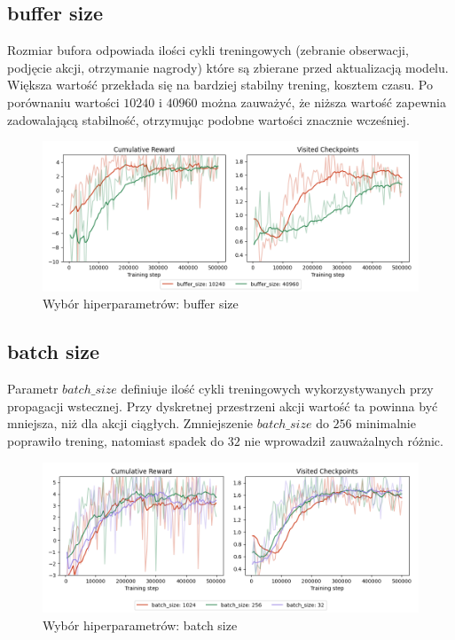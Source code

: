 \subsection{buffer size}
Rozmiar bufora odpowiada ilości cykli treningowych (zebranie obserwacji, podjęcie akcji, otrzymanie nagrody) które są zbierane przed aktualizacją modelu. Większa wartość przekłada się na bardziej stabilny trening, kosztem czasu. Po porównaniu wartości $10240$ i $40960$ można zauważyć, że niższa wartość zapewnia zadowalającą stabilność, otrzymując podobne wartości znacznie wcześniej.
\begin{figure}[H]
    \centering
    \includegraphics[width=\textwidth]{graphs/hyperparameters_buffer_size.png}
    \caption{Wybór hiperparametrów: buffer size}
    \label{fig}
\end{figure}

\subsection{batch size}
Parametr $batch\_size$ definiuje ilość cykli treningowych wykorzystywanych przy propagacji wstecznej. Przy dyskretnej przestrzeni akcji wartość ta powinna być mniejsza, niż dla akcji ciągłych. Zmniejszenie $batch\_size$ do $256$ minimalnie poprawiło trening, natomiast spadek do $32$ nie wprowadził zauważalnych różnic.
\begin{figure}[H]
    \centering
    \includegraphics[width=\textwidth]{graphs/hyperparameters_batch_size.png}
    \caption{Wybór hiperparametrów: batch size}
    \label{fig}
\end{figure}
\clearpage

